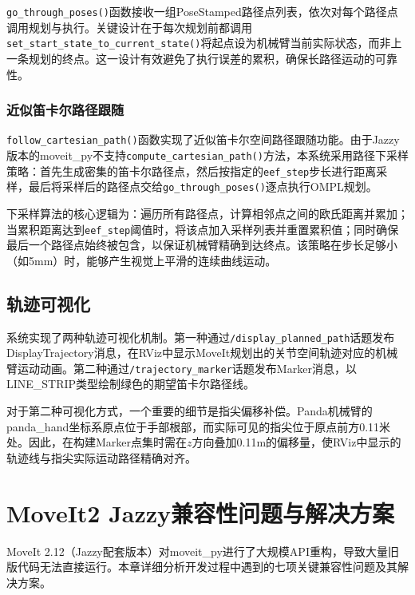 \documentclass[a4paper,12pt]{ctexart}
\newcommand{\bodytext}{\fontsize{12pt}{20pt}\selectfont\setlength{\parskip}{0pt}}
\begin{document}
\bodytext

\texttt{go\_through\_poses()}函数接收一组PoseStamped路径点列表，依次对每个路径点调用规划与执行。关键设计在于每次规划前都调用\texttt{set\_start\_state\_to\_current\_state()}将起点设为机械臂当前实际状态，而非上一条规划的终点。这一设计有效避免了执行误差的累积，确保长路径运动的可靠性。

\subsubsection{近似笛卡尔路径跟随}

\bodytext

\texttt{follow\_cartesian\_path()}函数实现了近似笛卡尔空间路径跟随功能。由于Jazzy版本的moveit\_py不支持\texttt{compute\_cartesian\_path()}方法，本系统采用路径下采样策略：首先生成密集的笛卡尔路径点，然后按指定的\texttt{eef\_step}步长进行距离采样，最后将采样后的路径点交给\texttt{go\_through\_poses()}逐点执行OMPL规划。

下采样算法的核心逻辑为：遍历所有路径点，计算相邻点之间的欧氏距离并累加；当累积距离达到\texttt{eef\_step}阈值时，将该点加入采样列表并重置累积值；同时确保最后一个路径点始终被包含，以保证机械臂精确到达终点。该策略在步长足够小（如5mm）时，能够产生视觉上平滑的连续曲线运动。

\subsection{轨迹可视化}

\bodytext

系统实现了两种轨迹可视化机制。第一种通过\texttt{/display\_planned\_path}话题发布DisplayTrajectory消息，在RViz中显示MoveIt规划出的关节空间轨迹对应的机械臂运动动画。第二种通过\texttt{/trajectory\_marker}话题发布Marker消息，以LINE\_STRIP类型绘制绿色的期望笛卡尔路径线。

对于第二种可视化方式，一个重要的细节是指尖偏移补偿。Panda机械臂的panda\_hand坐标系原点位于手部根部，而实际可见的指尖位于原点前方0.11米处。因此，在构建Marker点集时需在$z$方向叠加0.11m的偏移量，使RViz中显示的轨迹线与指尖实际运动路径精确对齐。

\section{MoveIt2 Jazzy兼容性问题与解决方案}

\bodytext

MoveIt 2.12（Jazzy配套版本）对moveit\_py进行了大规模API重构，导致大量旧版代码无法直接运行。本章详细分析开发过程中遇到的七项关键兼容性问题及其解决方案。
\end{document}
